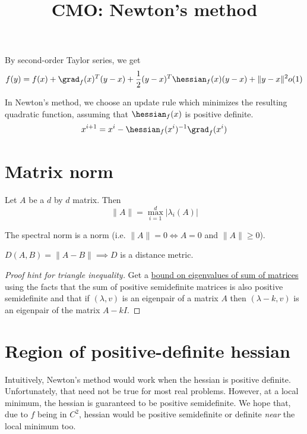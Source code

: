 


\title{CMO: Newton's method}



\maketitle
\initMinimal{}

By second-order Taylor series, we get
\[ f(y) = f(x) + \grad_f(x)^T(y-x) + \frac{1}{2}(y-x)^T\hessian_f(x)(y-x) + \|y-x\|^2o(1) \]

In Newton's method, we choose an update rule which minimizes the resulting quadratic function,
assuming that $\hessian_f(x)$ is positive definite.
\[ x^{i+1} = x^i - \hessian_f(x^i)^{-1}\grad_f(x^i) \]

\section{Matrix norm}

\begin{definition}
Let $A$ be a $d$ by $d$ matrix. Then
\[ \|A\| = \max_{i=1}^d |\lambda_i(A)| \]
\end{definition}

\begin{theorem}[Homework]
The spectral norm is a norm (i.e. $\|A\| = 0 \iff A = 0$ and $\|A\| \ge 0$).
\end{theorem}
\begin{theorem}[Homework]
$D(A, B) = \|A-B\| \implies D$ is a distance metric.
\end{theorem}
\begin{proof}[Proof hint for triangle inequality]
Get a \href{https://sharmaeklavya2.github.io/theoremdep/nodes/linear-algebra/eigenvectors/sum.html}
{bound on eigenvalues of sum of matrices} using the facts that the sum of positive semidefinite matrices
is also positive semidefinite and that if $(\lambda, v)$ is an eigenpair of a matrix $A$
then $(\lambda-k, v)$ is an eigenpair of the matrix $A - kI$.
\end{proof}

\section{Region of positive-definite hessian}

Intuitively, Newton's method would work when the hessian is positive definite.
Unfortunately, that need not be true for most real problems.
However, at a local minimum, the hessian is guaranteed to be positive semidefinite.
We hope that, due to $f$ being in $C^2$, hessian would be positive semidefinite or definite
\emph{near} the local minimum too.

